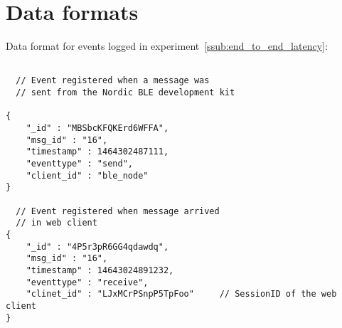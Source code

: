 \section{Data formats} %
\label{sec:data_formats}

Data format for events logged in experiment~\ref{ssub:end_to_end_latency}:

\begin{lstlisting}[caption={Event data format}, label={lst:event_dataformat}, basicstyle=\small]
  
  // Event registered when a message was
  // sent from the Nordic BLE development kit

{
	"_id" : "MBSbcKFQKErd6WFFA",
	"msg_id" : "16",
	"timestamp" : 1464302487111,
	"eventtype" : "send",
	"client_id" : "ble_node"
}

  // Event registered when message arrived
  // in web client
{
	"_id" : "4P5r3pR6GG4qdawdq",
	"msg_id" : "16",
	"timestamp" : 14643024891232,
	"eventtype" : "receive",
	"clinet_id" : "LJxMCrPSnpP5TpFoo"     // SessionID of the web client
}


\end{lstlisting}





